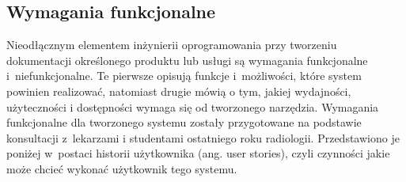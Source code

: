 \documentclass[a4paper,11pt,twoside,openright]{report}
\theoremstyle{definition}
\begin{document}
\subsection {Wymagania funkcjonalne}

Nieodłącznym elementem inżynierii oprogramowania przy tworzeniu dokumentacji
określonego produktu lub usługi są wymagania funkcjonalne i~niefunkcjonalne.
Te pierwsze opisują funkcje i~możliwości, które system powinien realizować, natomiast
drugie mówią o tym, jakiej wydajności, użyteczności i dostępności wymaga się od tworzonego narzędzia.
Wymagania funkcjonalne dla tworzonego systemu zostały przygotowane na podstawie
konsultacji z~lekarzami i studentami ostatniego roku radiologii. Przedstawiono
je poniżej w~postaci historii użytkownika (ang. user stories), czyli czynności
jakie może chcieć wykonać użytkownik tego systemu.
\end{document}
